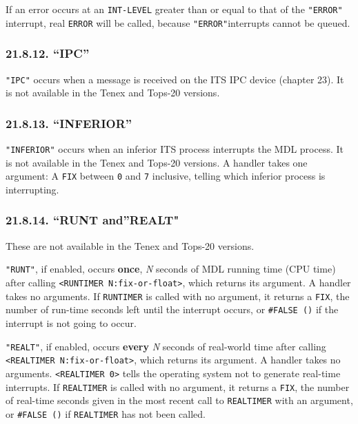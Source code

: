 \documentclass[a4paper,]{article}
\begin{document}
If an error occurs at an \texttt{INT-LEVEL} greater than or equal to that of the \texttt{"ERROR"} interrupt, real
\texttt{ERROR} will be called, because \texttt{"ERROR"}interrupts cannot be queued.

\subsubsection{\texorpdfstring{21.8.12. ``IPC''}{21.8.12. IPC}}\label{ipc}

\texttt{"IPC"}  occurs when a message is received on the ITS IPC device
(chapter 23). It is not available in the Tenex and Tops-20 versions.

\subsubsection{\texorpdfstring{21.8.13. ``INFERIOR''}{21.8.13. INFERIOR}}\label{inferior}

\texttt{"INFERIOR"}  occurs when an inferior ITS process interrupts
the MDL process. It is not available in the Tenex and Tops-20 versions. A
handler takes one argument: A \texttt{FIX} between \texttt{0} and \texttt{7} inclusive, telling which inferior process is
interrupting.

\subsubsection{\texorpdfstring{21.8.14. ``RUNT and''REALT"}{21.8.14. RUNT andREALT"}}\label{runt-andrealt}

These are not available in the Tenex and Tops-20 versions.

\texttt{"RUNT"},  if enabled, occurs \textbf{once}, \emph{N} seconds of MDL running time
(CPU time) after calling \texttt{\textless{}RUNTIMER\ N:fix-or-float\textgreater{}}, which
returns its argument. A handler takes no arguments. If \texttt{RUNTIMER} is called with no argument, it returns a
\texttt{FIX}, the number of run-time seconds left until the interrupt occurs, or \texttt{\#FALSE\ ()} if the interrupt is
not going to occur.

\texttt{"REALT"},  if enabled, occurs \textbf{every} \emph{N} seconds of real-world time
after calling \texttt{\textless{}REALTIMER\ N:fix-or-float\textgreater{}}, which returns
its argument. A handler takes no arguments. \texttt{\textless{}REALTIMER\ 0\textgreater{}} tells the operating system not
to generate real-time interrupts. If \texttt{REALTIMER} is called with no argument, it returns a \texttt{FIX}, the number
of real-time seconds given in the most recent call to \texttt{REALTIMER} with an argument, or \texttt{\#FALSE\ ()} if
\texttt{REALTIMER} has not been called.
\end{document}
